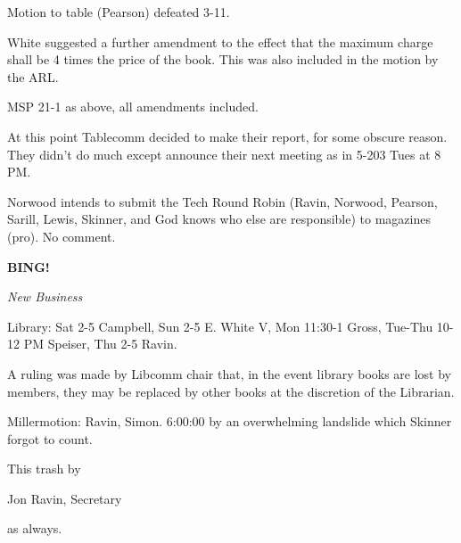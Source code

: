 \documentclass[12pt]{article}
\newcommand{\bing}{{\bf BING!} }
\newcommand{\goto}[1]{\bing \vskip 12pt \centerline{{\em{#1}}}}
\begin{document}
Motion to table (Pearson) defeated 3-11.

White suggested a further amendment to the effect that the maximum charge shall be 4 times the price of the book. This was also included in the motion by the ARL.

MSP 21-1 as above, all amendments included.

At this point Tablecomm decided to make their report, for some obscure reason. They didn't do much except announce their next meeting as in 5-203 Tues at 8 PM.

Norwood intends to submit the Tech Round Robin (Ravin, Norwood, Pearson, Sarill, Lewis, Skinner, and God knows who else are responsible) to magazines (pro). No comment.

\goto{New Business}

Library: Sat 2-5 Campbell, Sun 2-5 E. White V, Mon 11:30-1 Gross, Tue-Thu 10-12 PM Speiser, Thu 2-5 Ravin.

A ruling was made by Libcomm chair that, in the event library books are lost by members, they may be replaced by other books at the discretion of the Librarian.

Millermotion: Ravin, Simon. 6:00:00 by an overwhelming landslide which Skinner forgot to count.

\vspace{12pt}

\centerline{This trash by}
\centerline{Jon Ravin, Secretary}
\centerline{as always.}
\end{document}
